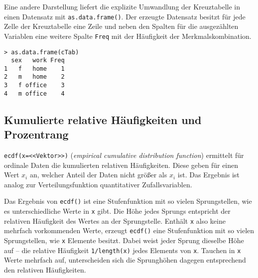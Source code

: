 Eine andere Darstellung liefert die explizite Umwandlung der Kreuztabelle in einen Datensatz mit \lstinline!as.data.frame()!. Der erzeugte Datensatz besitzt für jede Zelle der Kreuztabelle eine Zeile und neben den Spalten für die ausgezählten Variablen eine weitere Spalte \lstinline!Freq! mit der Häufigkeit der Merkmalskombination.
\begin{lstlisting}
> as.data.frame(cTab)
  sex   work Freq
1   f   home    1
2   m   home    2
3   f office    3
4   m office    4
\end{lstlisting}

\subsection{Kumulierte relative Häufigkeiten und Prozentrang}
\label{sec:stepfun}

\lstinline!ecdf(x=<<Vektor>>)! (\emph{empirical cumulative distribution function}) ermittelt für ordinale Daten die kumulierten relativen Häufigkeiten. Diese geben für einen Wert $x_{i}$ an, welcher Anteil der Daten nicht größer als $x_{i}$ ist. Das Ergebnis ist analog zur Verteilungsfunktion quantitativer Zufallsvariablen.

Das Ergebnis von \lstinline!ecdf()! ist eine Stufenfunktion mit so vielen Sprungstellen, wie es unterschiedliche Werte in \lstinline!x! gibt. Die Höhe jedes Sprungs entspricht der relativen Häufigkeit des Wertes an der Sprungstelle. Enthält \lstinline!x! also keine mehrfach vorkommenden Werte, erzeugt \lstinline!ecdf()! eine Stufenfunktion mit so vielen Sprungstellen, wie \lstinline!x! Elemente besitzt. Dabei weist jeder Sprung dieselbe Höhe auf -- die relative Häufigkeit \lstinline!1/length(x)! jedes Elements von \lstinline!x!. Tauchen in \lstinline!x! Werte mehrfach auf, unterscheiden sich die Sprunghöhen dagegen entsprechend den relativen Häufigkeiten.

